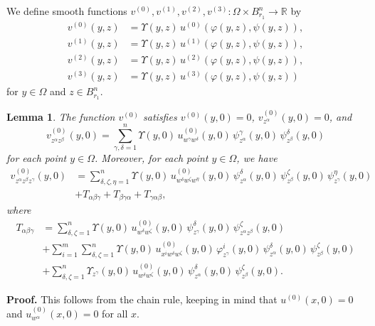 \documentclass[11pt]{amsart}
\newtheorem{lemma}[theorem]{Lemma}
\theoremstyle{definition}
\begin{document}
We define smooth functions $v^{(0)},v^{(1)},v^{(2)},v^{(3)}: \Omega \times B_{r_1}^n \to \mathbb{R}$ by 
\begin{align*} 
v^{(0)}(y,z) &= \Upsilon(y,z) \, u^{(0)}(\varphi(y,z),\psi(y,z)), \\ 
v^{(1)}(y,z) &= \Upsilon(y,z) \, u^{(1)}(\varphi(y,z),\psi(y,z)), \\ 
v^{(2)}(y,z) &= \Upsilon(y,z) \, u^{(2)}(\varphi(y,z),\psi(y,z)), \\ 
v^{(3)}(y,z) &= \Upsilon(y,z) \, u^{(3)}(\varphi(y,z),\psi(y,z)) 
\end{align*} 
for $y \in \Omega$ and $z \in B_{r_1}^n$. 

\begin{lemma}
\label{v0}
The function $v^{(0)}$ satisfies $v^{(0)}(y,0) = 0$, $v^{(0)}_{z^\alpha}(y,0) = 0$, and 
\[v^{(0)}_{z^\alpha z^\beta}(y,0) = \sum_{\gamma,\delta=1}^n \Upsilon(y,0) \, u^{(0)}_{w^\gamma w^\delta}(y,0) \, \psi^\gamma_{z^\alpha}(y,0) \, \psi^\delta_{z^\beta}(y,0)\] 
for each point $y \in \Omega$. Moreover, for each point $y \in \Omega$, we have 
\begin{align*} 
v^{(0)}_{z^\alpha z^\beta z^\gamma}(y,0) 
&= \sum_{\delta,\zeta,\eta=1}^n \Upsilon(y,0) \, u^{(0)}_{w^\delta w^\zeta w^\eta}(y,0) \, \psi^\delta_{z^\alpha}(y,0) \, \psi^\zeta_{z^\beta}(y,0) \, \psi^\eta_{z^\gamma}(y,0) \\ 
&+ T_{\alpha\beta\gamma} + T_{\beta\gamma\alpha} + T_{\gamma\alpha\beta}, 
\end{align*}
where 
\begin{align*} 
T_{\alpha\beta\gamma} 
&= \sum_{\delta,\zeta=1}^n \Upsilon(y,0) \, u^{(0)}_{w^\delta w^\zeta}(y,0) \, \psi^\delta_{z^\gamma}(y,0) \, \psi^\zeta_{z^\alpha z^\beta}(y,0) \\ 
&+ \sum_{i=1}^m \sum_{\delta,\zeta=1}^n \Upsilon(y,0) \, u^{(0)}_{x^i w^\delta w^\zeta}(y,0) \, \varphi^i_{z^\gamma}(y,0) \, \psi^\delta_{z^\alpha}(y,0) \, \psi^\zeta_{z^\beta}(y,0) \\ 
&+ \sum_{\delta,\zeta=1}^n \Upsilon_{z^\gamma}(y,0) \, u^{(0)}_{w^\delta w^\zeta}(y,0) \, \psi^\delta_{z^\alpha}(y,0) \, \psi^\zeta_{z^\beta}(y,0). 
\end{align*}
\end{lemma}

\textbf{Proof.} 
This follows from the chain rule, keeping in mind that $u^{(0)}(x,0) = 0$ and $u^{(0)}_{w^\alpha}(x,0) = 0$ for all $x$. \\
\end{document}
